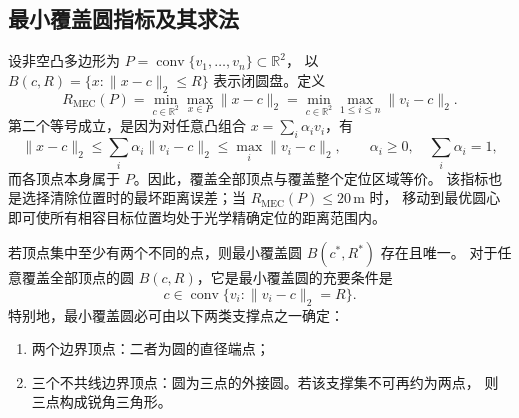 \subsection{最小覆盖圆指标及其求法}
\label{sec:q2-mec-rigorous}

设非空凸多边形为 $P=\operatorname{conv}\{v_1,\ldots,v_n\}\subset\mathbb R^2$，
以 $B(c,R)=\{x:\|x-c\|_2\le R\}$ 表示闭圆盘。定义
\begin{equation}
 R_{\mathrm{MEC}}(P)
 =\min_{c\in\mathbb R^2}\max_{x\in P}\|x-c\|_2
 =\min_{c\in\mathbb R^2}\max_{1\le i\le n}\|v_i-c\|_2.
 \label{eq:q2-mec-rigorous}
\end{equation}
第二个等号成立，是因为对任意凸组合 $x=\sum_i\alpha_i v_i$，有
\[
 \|x-c\|_2\le\sum_i\alpha_i\|v_i-c\|_2\le\max_i\|v_i-c\|_2,
 \qquad \alpha_i\ge0,\quad\sum_i\alpha_i=1,
\]
而各顶点本身属于 $P$。因此，覆盖全部顶点与覆盖整个定位区域等价。
该指标也是选择清除位置时的最坏距离误差；当 $R_{\mathrm{MEC}}(P)\le20\,\mathrm m$ 时，
移动到最优圆心即可使所有相容目标位置均处于光学精确定位的距离范围内。

\begin{mecproposition}[最小覆盖圆的支撑结构与最优性证书]
\label{prop:q2-mec-support}
若顶点集中至少有两个不同的点，则最小覆盖圆 $B(c^*,R^*)$ 存在且唯一。
对于任意覆盖全部顶点的圆 $B(c,R)$，它是最小覆盖圆的充要条件是
\begin{equation}
 c\in\operatorname{conv}\{v_i:\|v_i-c\|_2=R\}.
 \label{eq:q2-mec-hull-certificate}
\end{equation}
特别地，最小覆盖圆必可由以下两类支撑点之一确定：
\begin{enumerate}
 \item 两个边界顶点：二者为圆的直径端点；
 \item 三个不共线边界顶点：圆为三点的外接圆。若该支撑集不可再约为两点，
 则三点构成锐角三角形。
\end{enumerate}
\end{mecproposition}

